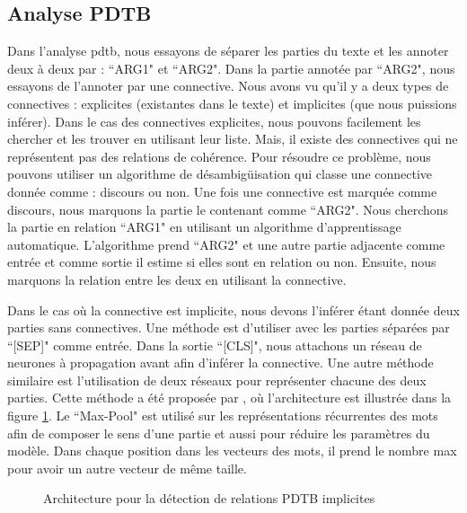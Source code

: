 \documentclass{KodeBook}
\begin{document}
\subsection{Analyse PDTB}

Dans l'analyse \ac{pdtb}, nous essayons de séparer les parties du texte et les annoter deux à deux par : ``ARG1" et ``ARG2". 
Dans la partie annotée par ``ARG2", nous essayons de l'annoter par une connective. 
Nous avons vu qu'il y a deux types de connectives : explicites (existantes dans le texte) et implicites (que nous puissions inférer). 
Dans le cas des connectives explicites, nous pouvons facilement les chercher et les trouver en utilisant leur liste. 
Mais, il existe des connectives qui ne représentent pas des relations de cohérence. 
Pour résoudre ce problème, nous pouvons utiliser un algorithme de désambigüisation qui classe une connective donnée comme : discours ou non. 
Une fois une connective est marquée comme discours, nous marquons la partie le contenant comme ``ARG2". 
Nous cherchons la partie en relation ``ARG1" en utilisant un algorithme d'apprentissage automatique. 
L'algorithme prend ``ARG2" et une autre partie adjacente comme entrée et comme sortie il estime si elles sont en relation ou non. 
Ensuite, nous marquons la relation entre les deux en utilisant la connective. 

Dans le cas où la connective est implicite, nous devons l'inférer étant donnée deux parties sans connectives. 
Une méthode est d'utiliser  avec les parties séparées par ``[SEP]" comme entrée. 
Dans la sortie ``[CLS]", nous attachons un réseau de neurones à propagation avant afin d'inférer la connective.
Une autre méthode similaire est l'utilisation de deux réseaux  pour représenter chacune des deux parties. 
Cette méthode a été proposée par \citet{2020-liang-al}, où l'architecture est illustrée dans la figure \ref{fig:pdtb-liang}.
Le ``Max-Pool" est utilisé sur les représentations récurrentes des mots afin de composer le sens d'une partie et aussi pour réduire les paramètres du modèle.
Dans chaque position dans les vecteurs des mots, il prend le nombre max pour avoir un autre vecteur de même taille.

\begin{figure}[!ht]
	\centering
	\caption[Architecture pour la détection de relations PDTB implicites]{Architecture pour la détection de relations PDTB implicites \cite{2020-liang-al}}
	\label{fig:pdtb-liang}
\end{figure}
\end{document}
